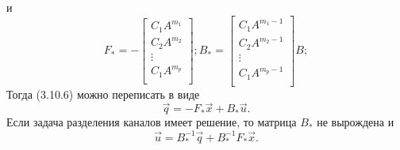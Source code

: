 и
\begin{equation}
	F_*=-
	\begin{bmatrix}
	    C_1A^{m_1}\\
	    C_2A^{m_2}\\
	    \vdots \\
	    C_1A^{m_p}\\
	\end{bmatrix};
	B_*=
	\begin{bmatrix}
	    C_1A^{m_1-1}\\
	    C_2A^{m_2-1}\\
	    \vdots \\
	    C_1A^{m_p-1}\\
	\end{bmatrix}B;
\end{equation}
Тогда (3.10.6) можно переписать в виде
\begin{equation}
	\vec{q}=-F_*\vec{x}+B_*\vec{u}.
\end{equation}
Если задача разделения каналов имеет решение, то матрица $B_*$ не вырождена и
\begin{equation}
	\vec{u}=B_*^{-1}\vec{q}+B_*^{-1}F_*\vec{x}.
\end{equation}

